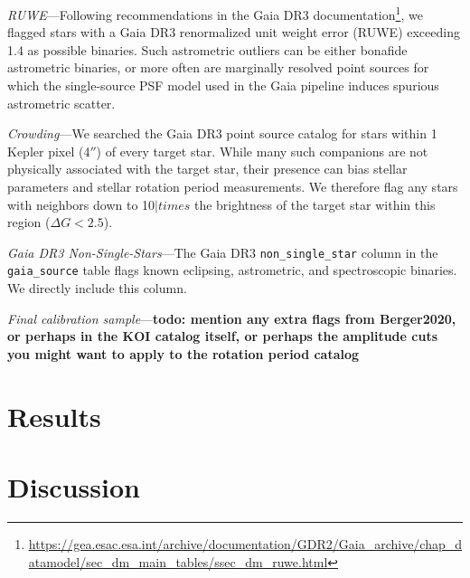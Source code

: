 \documentclass[11pt,twocolumn,tighten]{aastex63}
\begin{document}
{\it RUWE}---Following recommendations in the Gaia DR3
documentation\footnote{\url{https://gea.esac.esa.int/archive/documentation/GDR2/Gaia_archive/chap_datamodel/sec_dm_main_tables/ssec_dm_ruwe.html}},
we flagged stars with a Gaia DR3 renormalized unit weight error (RUWE)
exceeding 1.4 as possible binaries.  Such astrometric outliers can be
either bonafide astrometric binaries, or more often are marginally
resolved point sources for which the single-source PSF model used in
the Gaia pipeline induces spurious astrometric scatter.

{\it Crowding}---We searched the Gaia DR3 point source catalog for
stars within 1 Kepler pixel (4$''$) of every target star.
While many such companions are not physically associated with the
target star, their presence can bias stellar parameters and stellar
rotation period measurements.
We therefore flag any stars with neighbors down to 10$|times$ the 
brightness of the target star within this region ($\Delta G < 2.5$).

{\it Gaia DR3 Non-Single-Stars}---The Gaia DR3
\texttt{non\_single\_star} column in the \texttt{gaia\_source} table
flags known eclipsing, astrometric, and spectroscopic binaries.  We
directly include this column.

{\it Final calibration sample}---{\bf todo: mention any extra flags
from Berger2020, or perhaps in the KOI catalog itself, or perhaps the
amplitude cuts you might want to apply to the rotation period catalog}






\section{Results}
\label{sec:results}

\section{Discussion}
\label{sec:disc}
\end{document}

